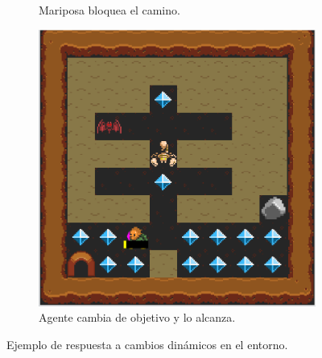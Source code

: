 \begin{figure}[H]
\begin{subfigure}{\textwidth}
        \caption{Mariposa bloquea el camino.}
        \label{fig:discrepancy_2}
    \end{subfigure}
    \par\bigskip
    \begin{subfigure}{\textwidth}
        \centering
        \includegraphics[scale=0.25]{img/CH08/discrepancy_3.png}
        \caption{Agente cambia de objetivo y lo alcanza.}
        \label{fig:discrepancy_3}
    \end{subfigure}
    \caption{Ejemplo de respuesta a cambios dinámicos en el entorno.}
    \label{fig:discrepancies}
\end{figure}